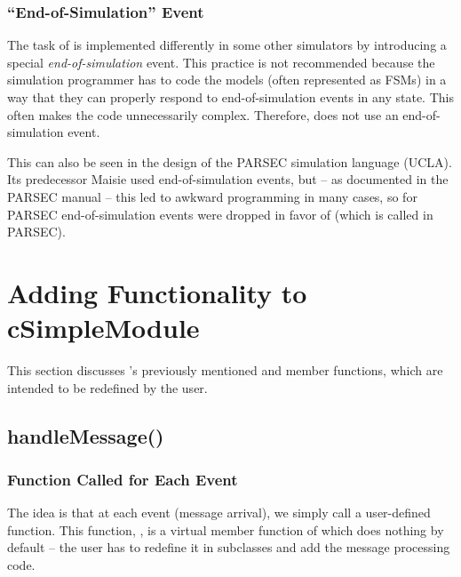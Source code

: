 \subsubsection{``End-of-Simulation'' Event}
\label{sec:simple-modules:end-of-simulation-event}

The task of  is implemented differently in some other simulators
by introducing a special \textit{end-of-simulation} event.
This practice is not recommended because the simulation programmer has to
code the models (often represented as FSMs) in a way that they can properly
respond to end-of-simulation events in any state. This often makes the code unnecessarily complex.
Therefore, {\opp} does not use an end-of-simulation event.

This can also be seen in the design of the PARSEC
simulation language (UCLA). Its predecessor Maisie used
end-of-simulation events, but -- as documented in the PARSEC manual --
this led to awkward programming in many cases, so for PARSEC
end-of-simulation events were dropped in favor of 
(which is called  in PARSEC).


\section{Adding Functionality to cSimpleModule}
\label{sec:simple-modules:handlemessage-and-activity}

This section discusses 's previously mentioned
 and  member functions, which are
intended to be redefined by the user.


\subsection{handleMessage()}
\label{sec:simple-modules:handlemessage}

\subsubsection{Function Called for Each Event}
\label{sec:simple-modules:handlemessage:overview}

The idea is that at each event (message arrival), we
simply call a user-defined function. This function,
, is a
virtual member function of  which does
nothing by default -- the user has to redefine it in subclasses
and add the message processing code.

